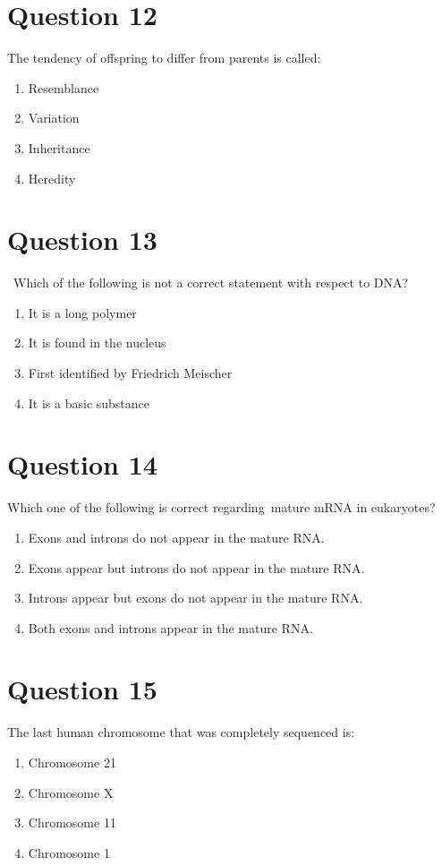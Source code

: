 \documentclass{article}
\begin{document}
\section*{Question 12}
The tendency of offspring to differ from parents is called:
\begin{enumerate}[label=(\alph*)]
\item Resemblance
\item Variation
\item Inheritance
\item Heredity
\end{enumerate}
\newpage
\section*{Question 13}
 Which of the following is not a correct statement with respect to DNA?
\begin{enumerate}[label=(\alph*)]
\item It is a long polymer
\item It is found in the nucleus
\item First identified by Friedrich Meischer
\item It is a basic substance\newline
\end{enumerate}
\newpage
\section*{Question 14}
Which one of the following is correct regarding mature mRNA in eukaryotes?
\begin{enumerate}[label=(\alph*)]
\item Exons and introns do not appear in the mature RNA.
\item Exons appear but introns do not appear in the mature RNA.
\item Introns appear but exons do not appear in the mature RNA.
\item Both exons and introns appear in the mature RNA.
\end{enumerate}
\newpage
\section*{Question 15}
The last human chromosome that was completely sequenced is:
\begin{enumerate}[label=(\alph*)]
\item Chromosome 21
\item Chromosome X
\item Chromosome 11
\item Chromosome 1
\end{enumerate}
\newpage
\end{document}
